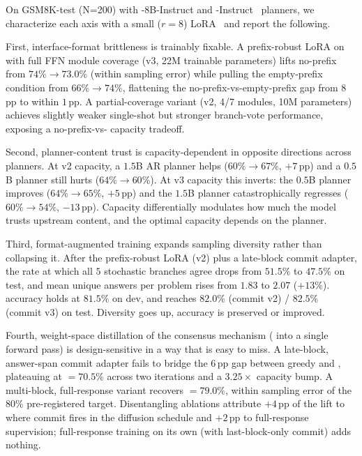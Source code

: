 On GSM8K-test (N=200) with \LLaDA{}-8B-Instruct and
-Instruct~\citep{qwen2024report} planners, we
characterize each axis with a small ($r{=}8$)
LoRA~\citep{hu2022lora,mangrulkar2022peft} and report the following.

First, interface-format brittleness is trainably fixable.  A
prefix-robust LoRA on \LLaDA{} with full FFN module coverage (v3,
22M trainable parameters) lifts no-prefix \ctwo{} from $74\% \to
73.0\%$ (within sampling error) while pulling the empty-prefix
 condition from $66\% \to 74\%$, flattening the
no-prefix-vs-empty-prefix gap from $8$\,pp to within $1$\,pp.  A
partial-coverage variant (v2, 4/7 modules, 10M parameters) achieves
slightly weaker single-shot but stronger branch-vote performance,
exposing a no-prefix-vs-\cmaj{} capacity tradeoff.

Second, planner-content trust is capacity-dependent in opposite
directions across planners.  At v2 capacity, a $1.5$B AR planner
helps ($60\% \to 67\%$, $+7$\,pp) and a $0.5$B planner still hurts
($64\% \to 60\%$).  At v3 capacity this inverts: the $0.5$B
planner improves ($64\% \to 65\%$, $+5$\,pp) and the $1.5$B
planner catastrophically regresses ($60\% \to 54\%$, $-13$\,pp).
Capacity differentially modulates how much the model trusts
upstream content, and the optimal capacity depends on the planner.

Third, format-augmented training expands sampling diversity rather
than collapsing it.  After the prefix-robust LoRA (v2) plus a
late-block commit adapter, the rate at which all $5$ stochastic
branches agree drops from $51.5\%$ to $47.5\%$ on test, and mean
unique answers per problem rises from $1.83$ to $2.07$ ($+13\%$).
\cmaj{} accuracy holds at $81.5\%$ on dev, and \cmajc{} reaches
$82.0\%$ (commit v2) / $82.5\%$ (commit v3) on test.  Diversity
goes up, accuracy is preserved or improved.

Fourth, weight-space distillation of the consensus mechanism
(\cmaj{} into a single forward pass) is design-sensitive in a way
that is easy to miss.  A late-block, answer-span commit adapter
fails to bridge the $6$\,pp gap between greedy \ctwo{} and \cmaj{},
plateauing at \ctwoc{}$=70.5\%$ across two iterations and a
$3.25\times$ capacity bump.  A multi-block, full-response variant
recovers \ctwoc{}$=79.0\%$, within sampling error of the $80\%$
pre-registered target.  Disentangling ablations attribute $+4$\,pp
of the lift to where commit fires in the diffusion schedule and
$+2$\,pp to full-response supervision; full-response training on its
own (with last-block-only commit) adds nothing.

